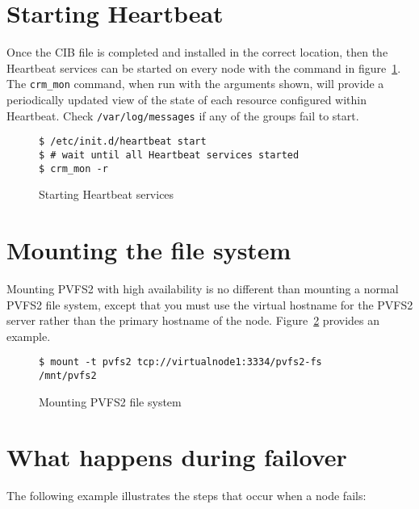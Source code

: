 \documentclass[11pt]{article}
\begin{document}
\section{Starting Heartbeat}

Once the CIB file is completed and installed in the correct location,
then the Heartbeat services can be started on every node with the
command in figure~\ref{fig:start}.  The \texttt{crm\_mon} command, when
run with the arguments shown, will provide a periodically updated view
of the state of each resource configured within Heartbeat.  Check
\texttt{/var/log/messages} if any of the groups fail to start.

\begin{figure}
\begin{scriptsize}
\begin{verbatim}
$ /etc/init.d/heartbeat start
$ # wait until all Heartbeat services started
$ crm_mon -r
\end{verbatim}
\end{scriptsize}
\caption{Starting Heartbeat services}
\label{fig:start}
\end{figure}

\section{Mounting the file system}

Mounting PVFS2 with high availability is no different than mounting a
normal PVFS2 file system, except that you must use the virtual hostname
for the PVFS2 server rather than the primary hostname of the node.
Figure~\ref{fig:mount} provides an example.

\begin{figure}
\begin{scriptsize}
\begin{verbatim}
$ mount -t pvfs2 tcp://virtualnode1:3334/pvfs2-fs /mnt/pvfs2
\end{verbatim}
\end{scriptsize}
\caption{Mounting PVFS2 file system}
\label{fig:mount}
\end{figure}

\section{What happens during failover}

The following example illustrates the steps that occur when a node fails:
\end{document}

